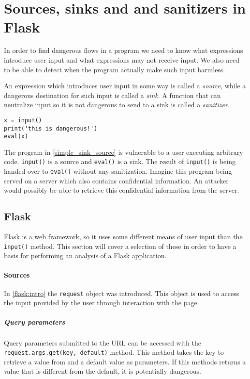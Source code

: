 \section{Sources, sinks and  and sanitizers in Flask}
In order to find dangerous flows in a program we need to know what expressions introduce user input and what expressions may not receive input.
We also need to be able to detect when the program actually make such input harmless.

An expression which introduces user input in some way is called a \emph{source}, while a dangerous destination for such input is called a \emph{sink}.
A function that can neutralize input so it is not dangerous to send to a sink is called a \emph{sanitizer}.

\begin{lstlisting}[style=python, caption={A simple vulnerable program}, label=simple_sink_source]
x = input()
print('this is dangerous!')
eval(x)
\end{lstlisting}

The program in \cref{simple_sink_source} is vulnerable to a user executing arbitrary code.
\texttt{input()} is a source and \texttt{eval()} is a sink.
The result of \texttt{input()} is being handed over to \texttt{eval()} without any sanitization.
Imagine this program being served on a server which also contains confidential information.
An attacker would possibly be able to retrieve this confidential information from the server.

\subsection{Flask}
Flask is a web framework, so it uses some different means of user input than the \texttt{input()} method.
This section will cover a selection of these in order to have a basis for performing an analysis of a Flask application.

\paragraph{Sources}
In \cref{flask:intro} the \texttt{request} object was introduced.
This object is used to access the input provided by the user through interaction with the page.

\subparagraph{Query parameters}
Query parameters submitted to the URL can be accessed with the \texttt{request.args.get(key, default)} method.
This method takes the key to retrieve a value from and a default value as parameters.
If this methods returns a value that is different from the default, it is potentially dangerous.

